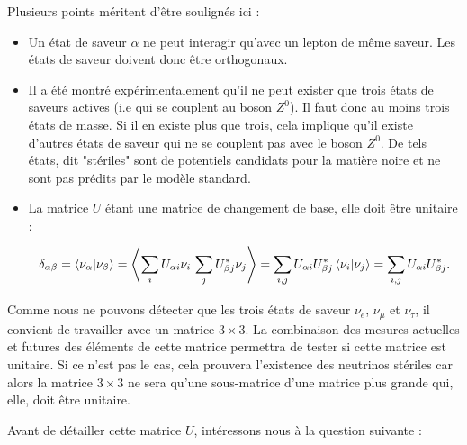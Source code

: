             Plusieurs points méritent d'être soulignés ici :
            \begin{itemize}
                \item Un état de saveur $\alpha$ ne peut interagir qu'avec un lepton de même saveur. Les états de saveur doivent donc être orthogonaux.
                \item Il a été montré expérimentalement qu'il ne peut exister que trois états de saveurs actives (i.e qui se couplent au boson $Z^0$)\cite{pdg2018}. Il faut donc au moins trois états de masse. Si il en existe plus que trois, cela implique qu'il existe d'autres états de saveur qui ne se couplent pas avec le boson $Z^0$. De tels états, dit "stériles" sont de potentiels candidats pour la matière noire et ne sont pas prédits par le modèle standard.
                \item La matrice $U$ étant une matrice de changement de base, elle doit être unitaire :
                \begin{equation*}
                    \delta_{\alpha\beta} = \braket{\nu_{\alpha}}{\nu_{\beta}} = \braket{\sum_i U_{\alpha i}\nu_i}{\sum_j U_{\beta j}^*\nu_j} = \sum_{i,j} U_{\alpha i}U_{\beta j}^* \braket{\nu_i}{\nu_j} = \sum_{i,j} U_{\alpha i}U_{\beta j}^*.
                \end{equation*}
            \end{itemize}
            Comme nous ne pouvons détecter que les trois états de saveur $\nu_e$, $\nu_{\mu}$ et $\nu_{\tau}$, il convient de travailler avec un matrice $3\times3$. La combinaison des mesures actuelles et futures des éléments de cette matrice\cite{Qian2013} permettra de tester si cette matrice est unitaire. Si ce n'est pas le cas, cela prouvera l'existence des neutrinos stériles car alors la matrice $3\times3$ ne sera qu'une sous-matrice d'une matrice plus grande qui, elle, doit être unitaire.
            
            Avant de détailler cette matrice $U$, intéressons nous à la question suivante : 
